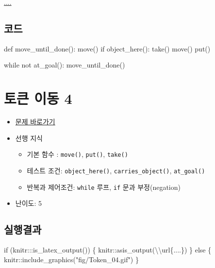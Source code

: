 \documentclass[
  b5paperpaper,
  DIV=11,
  numbers=noendperiod]{scrreprt}
\newenvironment{Shaded}{\begin{snugshade}}{\end{snugshade}}
\newcommand{\ControlFlowTok}[1]{\textcolor[rgb]{0.00,0.23,0.31}{#1}}
\newcommand{\FunctionTok}[1]{\textcolor[rgb]{0.28,0.35,0.67}{#1}}
\newcommand{\KeywordTok}[1]{\textcolor[rgb]{0.00,0.23,0.31}{#1}}
\newcommand{\NormalTok}[1]{\textcolor[rgb]{0.00,0.23,0.31}{#1}}
\newcommand{\SpecialCharTok}[1]{\textcolor[rgb]{0.37,0.37,0.37}{#1}}
\newcommand{\StringTok}[1]{\textcolor[rgb]{0.13,0.47,0.30}{#1}}
\providecommand{\tightlist}{%
  \setlength{\itemsep}{0pt}\setlength{\parskip}{0pt}}\usepackage{longtable,booktabs,array}
\begin{document}
\url{....}

\hypertarget{uxcf54uxb4dc-17}{%
\subsection{코드}\label{uxcf54uxb4dc-17}}

\begin{Shaded}
\begin{Highlighting}[]
\KeywordTok{def}\NormalTok{ move\_until\_done():}
\NormalTok{    move()}
    \ControlFlowTok{if}\NormalTok{ object\_here():}
\NormalTok{        take()}
\NormalTok{        move()}
\NormalTok{        put()}
        
\ControlFlowTok{while} \KeywordTok{not}\NormalTok{ at\_goal():}
\NormalTok{    move\_until\_done()}
\end{Highlighting}
\end{Shaded}

\hypertarget{token-04}{%
\section{토큰 이동 4}\label{token-04}}

\begin{itemize}
\tightlist
\item
  \href{https://reeborg.ca/reeborg.html?lang=ko-en\&mode=python\&menu=worlds\%2Fmenus\%2Freeborg_intro_en.json\&name=Tokens\%204\&url=worlds\%2Ftutorial_en\%2Ftokens4.json}{문제
  바로가기}
\item
  선행 지식

  \begin{itemize}
  \tightlist
  \item
    기본 함수 : \texttt{move()}, \texttt{put()}, \texttt{take()}
  \item
    테스트 조건: \texttt{object\_here()}, \texttt{carries\_object()},
    \texttt{at\_goal()}
  \item
    반복과 제어조건: \texttt{while} 루프, \texttt{if} 문과
    부정(negation)
  \end{itemize}
\item
  난이도: 5
\end{itemize}

\hypertarget{uxc2e4uxd589uxacb0uxacfc-18}{%
\subsection{실행결과}\label{uxc2e4uxd589uxacb0uxacfc-18}}

\begin{Shaded}
\begin{Highlighting}[]
\ControlFlowTok{if}\NormalTok{ (knitr}\SpecialCharTok{:::}\FunctionTok{is\_latex\_output}\NormalTok{()) \{}
\NormalTok{  knitr}\SpecialCharTok{::}\FunctionTok{asis\_output}\NormalTok{(}\StringTok{\textquotesingle{}}\SpecialCharTok{\textbackslash{}\textbackslash{}}\StringTok{url\{....\}\textquotesingle{}}\NormalTok{)}
\NormalTok{\} }\ControlFlowTok{else}\NormalTok{ \{}
\NormalTok{  knitr}\SpecialCharTok{::}\FunctionTok{include\_graphics}\NormalTok{(}\StringTok{"fig/Token\_04.gif"}\NormalTok{)}
\NormalTok{\}}
\end{Highlighting}
\end{Shaded}
\end{document}
